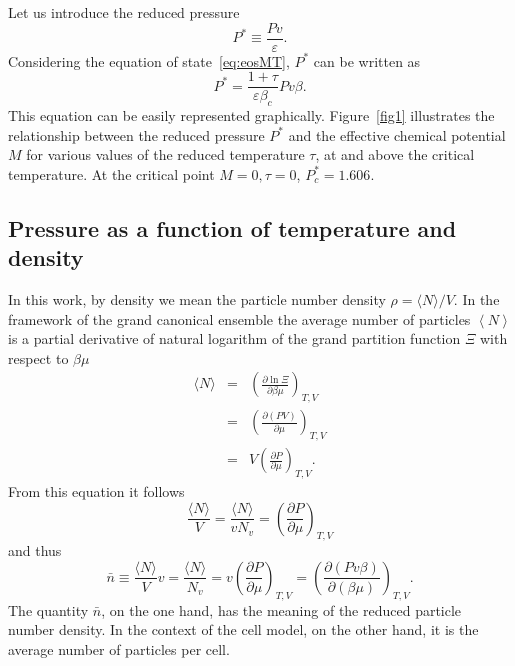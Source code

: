 \documentclass[12pt]{article}
\begin{document}
	Let us introduce the reduced pressure
	\begin{equation}
		\label{def:reduced_pres}
		P^* \equiv \frac{P v}{\varepsilon}.
	\end{equation}
	Considering the equation of state~\eqref{eq:eosMT}, $P^*$ can be written as
	\begin{equation}
		\label{eq:reduced_pres}
		P^* = \frac{1 + \tau}{\varepsilon \beta_c} Pv\beta.
	\end{equation}
	This equation can be easily represented graphically. Figure~\ref{fig1} illustrates the relationship between the reduced pressure $P^*$ and the effective chemical potential $M$ for various values of the reduced temperature $\tau$, at and above the critical temperature. At the critical point $M=0, \tau=0$, $P^*_c = 1.606$. 
	
	
	\subsection{Pressure as a function of temperature and density}
	In this work, by density we mean the particle number density $\rho = \langle N \rangle / V$.
	In the framework of the grand canonical ensemble the average number of particles $\left\langle N \right\rangle$ is a partial derivative of natural logarithm of the grand partition function $\Xi$ with respect to $\beta \mu$ 
	\begin{eqnarray*}
		\langle N \rangle & = & \left(\frac{\partial \ln\Xi}{\partial \beta \mu}\right)_{T,V} 
		\\
		& = & \left(\frac{\partial (PV)}{\partial \mu}\right)_{T,V}
		\\
		& = & V \left(\frac{\partial P}{\partial \mu}\right)_{T,V}.
	\end{eqnarray*}
	From this equation it follows
	\begin{equation*}
		\frac{\langle N \rangle}{V} = \frac{\langle N \rangle}{v N_v} = \left(\frac{\partial P}{\partial \mu}\right)_{T,V}
	\end{equation*}
	and thus
	\begin{equation}
		\bar{n} \equiv \frac{\langle N \rangle}{V} v = \frac{\langle N \rangle}{N_v} = v \left(\frac{\partial P}{\partial \mu}\right)_{T,V} 
		= \left(\frac{\partial (Pv\beta)}{\partial (\beta \mu)}\right)_{T,V}.
	\end{equation}
	The quantity $\bar{n}$, on the one hand, has the meaning of the reduced particle number density. In the context of the cell model, on the other hand, it is the average number of particles per cell.
\end{document}
